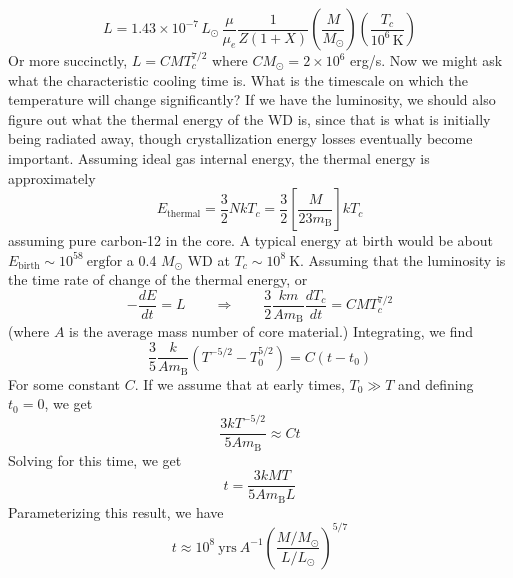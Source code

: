 \documentclass[10pt]{article}
\numberwithin{equation}{section}
\begin{document}
	\begin{equation}
		\label{eq:cooling:11} L = 1.43\times 10^{-7}\,L_\odot\,\frac{\mu}{\mu_e}\frac{1}{Z(1+X)} \left(\frac{M}{M_\odot}\right)\left(\frac{T_c}{10^6\,\mathrm{K}}\right)
	\end{equation}
	Or more succinctly, $ L = CMT_c^{7/2}$ where $CM_\odot = 2\times 10^6$ erg/s. Now we might ask what the characteristic cooling time is. What is the timescale on which the temperature will change significantly? If we have the luminosity, we should also figure out what the thermal energy of the WD is, since that is what is initially being radiated away, though crystallization energy losses eventually become important. Assuming ideal gas internal energy, the thermal energy is approximately
	\begin{equation}
		\label{eq:cooling:12} E_{\mathrm{thermal}} = \frac{3}{2} N k T_c = \frac{3}{2} \left[\frac{ M }{ 23 m_{\mathrm{B}}}\right]k T_c
	\end{equation}
	assuming pure carbon-12 in the core. A typical energy at birth would be about $E_{\mathrm{birth}}\sim 10^{58}\ \mathrm{erg}$for a 0.4 $M_\odot$ WD at $T_c\sim 10^8\ \mathrm{K}$. Assuming that the luminosity is the time rate of change of the thermal energy, or
	\begin{equation}
		\label{eq:cooling:13} -\frac{dE}{dt} = L \qquad \Rightarrow \qquad \frac{3}{2} \frac{k m}{A m_{\mathrm{B}}} \frac{dT_c}{dt} = CM T_c^{7/2}
	\end{equation}
	(where $A$ is the average mass number of core material.) Integrating, we find
	\begin{equation}
		\label{eq:cooling:14} \frac{3}{5} \frac{k}{A m_{\mathrm{B}}}\left(T^{-5/2} - T_0^{5/2}\right) = C (t-t_0)
	\end{equation}
	For some constant $C$. If we assume that at early times, $T_0 \gg T$ and defining $t_0=0$, we get
	\begin{equation}
		\label{eq:cooling:15} \frac{3 k T^{-5/2}}{5 A m_{\mathrm{B}}} \approx Ct
	\end{equation}
	Solving for this time, we get
	\begin{equation}
		\label{eq:cooling:16} t = \frac{3k M T}{5 A m_{\mathrm{B}} L}
	\end{equation}
	Parameterizing this result, we have
	\begin{equation}
		\label{eq:cooling:17} t \approx 10^8\ \mathrm{yrs}\ A^{-1}\left(\frac{M/M_\odot}{L/L_\odot}\right)^{5/7}
	\end{equation}
	
\end{document}
